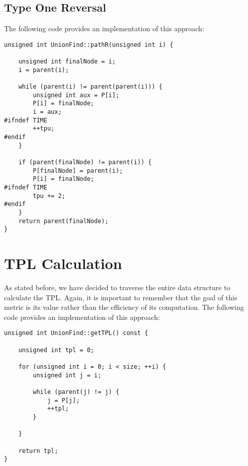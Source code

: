 \subsection{Type One Reversal}
The following code provides an implementation of this approach:

\begin{verbatim}
unsigned int UnionFind::pathR(unsigned int i) {

    unsigned int finalNode = i;
    i = parent(i);

    while (parent(i) != parent(parent(i))) {
        unsigned int aux = P[i];
        P[i] = finalNode;
        i = aux;
#ifndef TIME
        ++tpu;
#endif
    }

    if (parent(finalNode) != parent(i)) {
        P[finalNode] = parent(i);
        P[i] = finalNode;
#ifndef TIME
        tpu += 2;
#endif
    }
    return parent(finalNode);
}
\end{verbatim}

\newpage

\section{TPL Calculation}\label{ap:TPL}
As stated before, we have decided to traverse the entire data structure to calculate the TPL. Again, it is important to remember that the goal of this metric is its value rather than the efficiency of its computation. The following code provides an implementation of this approach:

\begin{verbatim}
unsigned int UnionFind::getTPL() const {

    unsigned int tpl = 0;

    for (unsigned int i = 0; i < size; ++i) {
        unsigned int j = i;

        while (parent(j) != j) {
            j = P[j];
            ++tpl;
        }

    }

    return tpl;
}
\end{verbatim}
